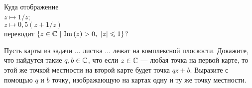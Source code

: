 \documentclass[a4paper, 12pt]{article}
\begin{document}



Куда отображение\\
$z\longmapsto1/z$;\\
 $z\longmapsto0,5(z+1/z)$\\
переводит %
$\{z\in\Cbb\ |\ {\rm Im}\,(z)>0,\ |z|\leq1\}$?


Пусть карты из задачи ... листка ... лежат на комплексной плоскости.
Докажите, что найдутся такие $q,b\in\mathbb{C}$, что
если $z\in\mathbb{C}$ --- любая точка на первой карте, то этой же точкой местности
на второй карте будет точка $qz+b$.
Выразите с помощью  $q$ и $b$ точку,
изображающую на картах одну и ту же точку местности.





\vspace*{-1mm}



\end{document}
